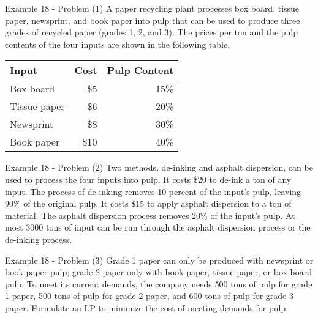 \begin{frame}{Example 18 - Problem (1)}
A paper recycling plant processes box board, tissue paper, newsprint, and book
paper into pulp that can be used to produce three grades of recycled paper
(grades 1, 2, and 3). The prices per ton and the pulp contents of the four
inputs are shown in the following table.

\begin{center}
\begin{tabular}{lrr}
\hline
  \cellcolor{gray90}\textbf{Input}
& \cellcolor{gray90}\textbf{Cost}
& \cellcolor{gray90}\textbf{Pulp Content} \\
\hline
Box board    &  \$5 & 15\% \\
Tissue paper &  \$6 & 20\% \\
Newsprint    &  \$8 & 30\% \\
Book paper   & \$10 & 40\% \\
\hline
\end{tabular}
\end{center}

\end{frame}

\begin{frame}{Example 18 - Problem (2)}
Two methods, de-inking and asphalt dispersion, can be used to process the four
inputs into pulp. It costs \$20 to de-ink a ton of any input. The process of
de-inking removes 10 percent of the input’s pulp, leaving 90\% of the original
pulp. It costs \$15 to apply asphalt dispersion to a ton of material. The
asphalt dispersion process removes 20\% of the input’s pulp. At most 3000 tons
of input can be run through the asphalt dispersion process or the de-inking
process.
\end{frame}

\begin{frame}{Example 18 - Problem (3)}
Grade 1 paper can only be produced with newsprint or book paper pulp; grade 2
paper only with book paper, tissue paper, or box board pulp. To meet its current
demands, the company needs 500 tons of pulp for grade 1 paper, 500 tons of pulp
for grade 2 paper, and 600 tons of pulp for grade 3 paper. Formulate an LP to
minimize the cost of meeting demands for pulp.
\end{frame}
